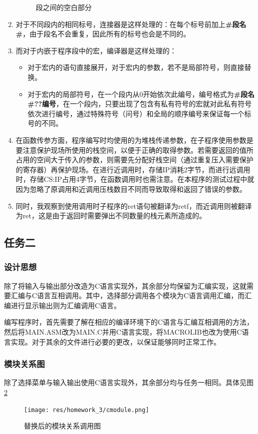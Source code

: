 \documentclass{article}
\begin{document}
\begin{enumerate}
\begin{figure}[H]
				\caption{段之间的空白部分}
				\label{fig:emptysegment}
			\end{figure}
		\item 对于不同段内的相同标号，连接器是这样处理的：在每个标号前加上{\textbf{\#段名\#}}，由于段名不会重复，因此所有的标号也会是不同的。
		\item 而对于内嵌于程序段中的宏，编译器是这样处理的：
			\begin{itemize}
				\item 对于宏内的语句直接展开，对于宏内的参数，若不是局部符号，则直接替换。
				\item 对于宏内的局部符号，在一个段内从0开始依次此编号，编号格式为{\textbf{\#段名\#??编号}}，在一个段内，只要出现了包含有私有符号的宏就对此私有符号依次进行编号，通过特殊符号（问号）和全局的顺序编号来保证每一个标号的不同。
			\end{itemize}
		\item 在函数传参方面，程序编写时均使用的为堆栈传递参数，在子程序使用参数是要注意保护现场所使用的栈空间，以便于正确的取得参数。若需要返回的值所占用的空间大于传入的参数，则需要先分配好栈空间（通过重复压入需要保护的寄存器）再保护现场。在进行近调用时，存储IP消耗2字节，而进行远调用时，存储CS:IP占用4字节，在函数调用时也需注意。在本程序的测试过程中就因为忽略了原调用和近调用压栈数目不同而导致取得和返回了错误的参数。
		\item 同时，我观察到使用调用时子程序的ret语句被翻译为retf，而近调用则被翻译为ret，这是由于返回时需要弹出不同数量的栈元素所造成的。
	\end{enumerate}


	\subsection{任务二}
	\subsubsection{设计思想}
	除了将输入与输出部分改造为C语言实现外，其余部分均保留为汇编实现，这就需要汇编与C语言互相调用。其中，选择部分调用各个模块为C语言调用汇编，而汇编进行显示输出则为汇编调用C语言。\par
	编写程序时，首先需要了解在相应的编译环境下的C语言与汇编互相调用的方法，然后将MAIN.ASM改为MAIN.C并用C语言实现，将MACROLIB也改为使用C语言实现。对于其余的文件进行必要的更改，以保证能够同时正常工作。

	\subsubsection{模块关系图}
	除了选择菜单与输入输出使用C语言实现外，其余部分均与任务一相同。具体见图\ref{fig:cmodule}
	\begin{figure}[H]
		\centering
		\texttt{[image: res/homework\_3/cmodule.png]}
		\caption{替换后的模块关系调用图}
		\label{fig:cmodule}
	\end{figure}
\end{document}
